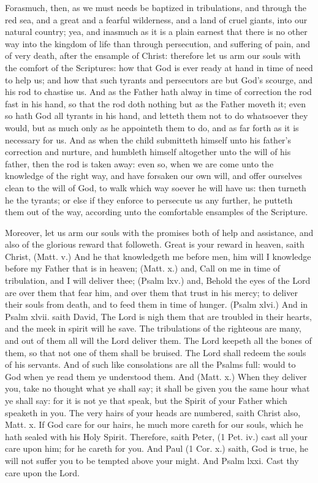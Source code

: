 Forasmuch, then, as we must needs be baptized
in tribulations, and through the red sea, 
and a great and a fearful wilderness, and a land 
of cruel giants, into our natural country; yea,
and inasmuch as it is a plain earnest that there
is no other way into the kingdom of life than
through persecution, and suffering of pain, and 
of very death, after the ensample of Christ:
therefore let us arm our souls with the comfort 
of the Scriptures: how that God is ever ready 
at hand in time of need to help us; and how 
that such tyrants and persecutors are but God's 
scourge, and his rod to chastise us. And as the 
Father hath alway in time of correction the rod 
fast in his hand, so that the rod doth nothing but 
as the Father moveth it; even so hath God all 
tyrants in his hand, and letteth them not to do 
whatsoever they would, but as much only as he 
appointeth them to do, and as far forth as it is 
necessary for us. And as when the child submitteth
himself unto his father's correction and 
nurture, and humbleth himself altogether unto the 
will of his father, then the rod is taken away:
even so, when we are come unto the knowledge 
of the right way, and have forsaken our own 
will, and offer ourselves clean to the will of 
God, to walk which way soever he will have us:
then turneth he the tyrants; or else if they 
enforce to persecute us any further, he putteth
them out of the way, according unto the comfortable
ensamples of the Scripture. 

Moreover, let us arm our souls with the 
promises both of help and assistance, and also of 
the glorious reward that followeth. Great is 
your reward in heaven, saith Christ, (Matt. v.) 
And he that knowledgeth me before men, him
will I knowledge before my Father that is in 
heaven; (Matt. x.) and, Call on me in time of
tribulation, and I will deliver thee; (Psalm lxv.)
and, Behold the eyes of the Lord are over them 
that fear him, and over them that trust in his 
mercy; to deliver their souls from death, and to 
feed them in time of hunger. (Psalm xlvi.) And 
in Psalm xlvii. saith David, The Lord is nigh 
them that are troubled in their hearts, and the 
meek in spirit will he save. The tribulations of 
the righteous are many, and out of them all will 
the Lord deliver them. The Lord keepeth all 
the bones of them, so that not one of them shall be 
bruised. The Lord shall redeem the souls of 
his servants. And of such like consolations are 
all the Psalms full: would to God when ye read 
them ye understood them. And (Matt. x.) When 
they deliver you, take no thought what ye shall 
say; it shall be given you the same hour what ye 
shall say: for it is not ye that speak, but the 
Spirit of your Father which speaketh in you. The 
very hairs of your heads are numbered, saith 
Christ also, Matt. x. If God care for our hairs, 
he much more careth for our souls, which he hath 
sealed with his Holy Spirit. Therefore, saith 
Peter, (1 Pet. iv.) cast all your care upon him;
for he careth for you. And Paul (1 Cor. x.)
saith, God is true, he will not suffer you to be
tempted above your might. And Psalm lxxi.
Cast thy care upon the Lord. 

